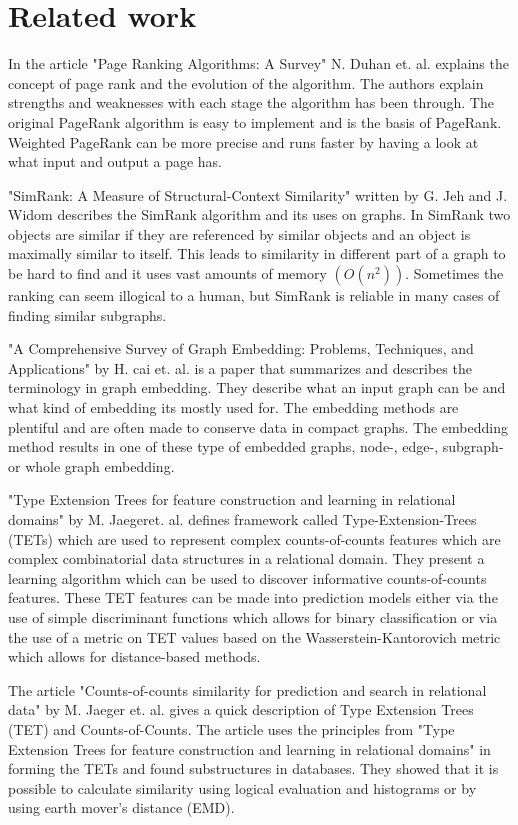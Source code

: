\section{Related work}
\label{Related_work}
In the article "Page Ranking Algorithms: A Survey" N. Duhan et. al.\cite{4809246} explains the concept of page rank and the evolution of the algorithm. The authors explain strengths and weaknesses with each stage the algorithm has been through. The original PageRank algorithm is easy to implement and is the basis of PageRank. Weighted PageRank can be more precise and runs faster by having a look at what input and output a page has.

"SimRank: A Measure of Structural-Context Similarity" written by G. Jeh and J. Widom\cite{10.1145/775047.775126} describes the SimRank algorithm and its uses on graphs. In SimRank two objects are similar if they are referenced by similar objects and an object is maximally similar to itself. This leads to similarity in different part of a graph to be hard to find and it uses vast amounts of memory $(O(n^2))$. Sometimes the ranking can seem illogical to a human, but SimRank is reliable in many cases of finding similar subgraphs.

"A Comprehensive Survey of Graph Embedding: Problems, Techniques, and Applications" by H. cai et. al.\cite{8294302} is a paper that summarizes and describes the terminology in graph embedding. They describe what an input graph can be and what kind of embedding its mostly used for. The embedding methods are plentiful and are often made to conserve data in compact graphs. The embedding method results in one of these type of embedded graphs, node-, edge-, subgraph- or whole graph embedding.

"Type Extension Trees for feature construction and learning in relational domains" by M. Jaegeret. al. \cite{JAEGER201330} defines framework called Type-Extension-Trees (TETs) which are used to represent complex counts-of-counts features which are complex combinatorial data structures in a relational domain. They present a learning algorithm which can be used to discover informative counts-of-counts features. These TET features can be made into prediction models either via the use of simple discriminant functions which allows for binary classification or via the use of a metric on TET values based on the Wasserstein-Kantorovich metric which allows for distance-based methods.

The article "Counts-of-counts similarity for prediction and search in relational data" by M. Jaeger et. al.\cite{jaeger2019counts}  gives a quick description of Type Extension Trees (TET) and Counts-of-Counts. The article uses the principles from "Type Extension Trees for feature construction and learning in relational domains" in forming the TETs and found substructures in databases. They showed that it is possible to calculate similarity using logical evaluation and histograms or by using earth mover's distance (EMD).

